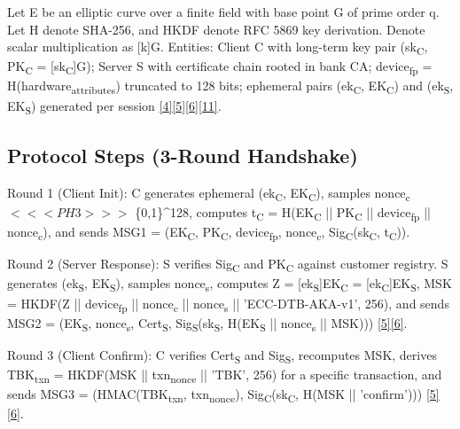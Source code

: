 \indent Let E be an elliptic curve over a finite field with base point G of prime order q. Let H denote SHA-256, and HKDF denote RFC 5869 key derivation. Denote scalar multiplication as [k]G. Entities: Client C with long-term key pair (sk\textsubscript{C}, PK\textsubscript{C} = [sk\textsubscript{C}]G); Server S with certificate chain rooted in bank CA; device\textsubscript{fp} = H(hardware\textsubscript{attributes}) truncated to 128 bits; ephemeral pairs (ek\textsubscript{C}, EK\textsubscript{C}) and (ek\textsubscript{S}, EK\textsubscript{S}) generated per session \hyperref[ref:4]{[4]}\hyperref[ref:5]{[5]}\hyperref[ref:6]{[6]}\hyperref[ref:11]{[11]}.

\subsection{Protocol Steps (3-Round Handshake)}

\indent Round 1 (Client Init): C generates ephemeral (ek\textsubscript{C}, EK\textsubscript{C}), samples nonce\textsubscript{c} $<<<PH3>>>$ \{0,1\}\textasciicircum{}128, computes t\textsubscript{C} = H(EK\textsubscript{C} || PK\textsubscript{C} || device\textsubscript{fp} || nonce\textsubscript{c}), and sends MSG1 = (EK\textsubscript{C}, PK\textsubscript{C}, device\textsubscript{fp}, nonce\textsubscript{c}, Sig\textsubscript{C}(sk\textsubscript{C}, t\textsubscript{C})).

\indent Round 2 (Server Response): S verifies Sig\textsubscript{C} and PK\textsubscript{C} against customer registry. S generates (ek\textsubscript{S}, EK\textsubscript{S}), samples nonce\textsubscript{s}, computes Z = [ek\textsubscript{S}]EK\textsubscript{C} = [ek\textsubscript{C}]EK\textsubscript{S}, MSK = HKDF(Z || device\textsubscript{fp} || nonce\textsubscript{c} || nonce\textsubscript{s} || 'ECC-DTB-AKA-v1', 256), and sends MSG2 = (EK\textsubscript{S}, nonce\textsubscript{s}, Cert\textsubscript{S}, Sig\textsubscript{S}(sk\textsubscript{S}, H(EK\textsubscript{S} || nonce\textsubscript{s} || MSK))) \hyperref[ref:5]{[5]}\hyperref[ref:6]{[6]}.

\indent Round 3 (Client Confirm): C verifies Cert\textsubscript{S} and Sig\textsubscript{S}, recomputes MSK, derives TBK\textsubscript{txn} = HKDF(MSK || txn\textsubscript{nonce} || 'TBK', 256) for a specific transaction, and sends MSG3 = (HMAC(TBK\textsubscript{txn}, txn\textsubscript{nonce}), Sig\textsubscript{C}(sk\textsubscript{C}, H(MSK || 'confirm'))) \hyperref[ref:5]{[5]}\hyperref[ref:6]{[6]}.

